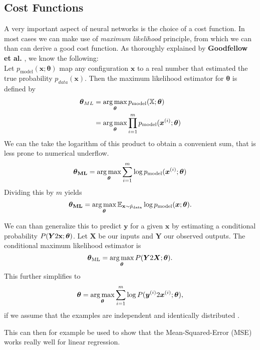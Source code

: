 \subsection{Cost Functions}
\label{sec:cost-functions}

A very important aspect of neural networks is the choice of a cost function.
In most cases we can make use of \emph{maximum likelihood} principle, from which we can than can derive a good cost function.
As thoroughly explained by \textbf{Goodfellow et al.} \cite{Goodfellow-et-al-2016}, we know the following: \\

Let \(p_{\text{model}}(\boldsymbol{x}; \boldsymbol{\theta})\) map any configuration \(\boldsymbol{x}\) to a real number that estimated the true probability \(p_{data}(\boldsymbol{x})\).
Then the maximum likelihood estimator for \(\boldsymbol{\theta}\) is defined by
\begin{align}
    \boldsymbol{\theta}_{ML} &= \operatorname*{arg\,max}_{\boldsymbol{\theta}} p_{\text{model}} (\mathbb{X}; \boldsymbol{\theta}) \\
    &= \operatorname*{arg\,max}_{\boldsymbol{\theta}} \prod^{m}_{i = 1} p_{\text{model}} (\boldsymbol{x}^{(i)}; \boldsymbol{\theta})
\end{align}
We can the take the logarithm of this product to obtain a convenient sum, that is less prone to numerical underflow.
\begin{equation}
    \boldsymbol{\theta}_{\textbf{ML}} = \operatorname*{arg\,max}_{\boldsymbol{\theta}} \sum^{m}_{i = 1} \log p_{\text{model}} (\boldsymbol{x}^{(i)}; \boldsymbol{\theta})
\end{equation}
Dividing this by \(m\) yields
\begin{equation}
    \boldsymbol{\theta}_{\textbf{ML}} = \operatorname*{arg\,max}_{\boldsymbol{\theta}} \mathbb{E}_{\textbf{x} \sim \hat{p}_{\text{data}}} \log p_{\text{model}} (\boldsymbol{x}; \boldsymbol{\theta}).
\end{equation}

We can than generalize this to predict \(\boldsymbol{y}\) for a given \(\boldsymbol{x}\) by estimating a conditional probability \(P(\boldsymbol{Y} 2 \textbf{x}; \boldsymbol{\theta})\).
Let \(\boldsymbol{X}\) be our inputs and \(\boldsymbol{Y}\) our observed outputs.
The conditional maximum likelihood estimator is
\begin{equation}
    \boldsymbol{\theta}_{\text{ML}} = \operatorname*{arg\,max}_{\boldsymbol{\theta}} P (\boldsymbol{Y} 2 \boldsymbol{X}; \boldsymbol{\theta}).
\end{equation}
This further simplifies to
\begin{equation}
    \boldsymbol{\theta} = \operatorname*{arg\,max}_{\boldsymbol{\theta}} \sum^{m}_{i = 1} \log P (\boldsymbol{y}^{(i)} 2 \boldsymbol{x}^{(i)}; \boldsymbol{\theta}),
\end{equation}
if we assume that the examples are independent and identically distributed .

This can then for example be used to show that the Mean-Squared-Error (MSE) works really well for linear regression.

